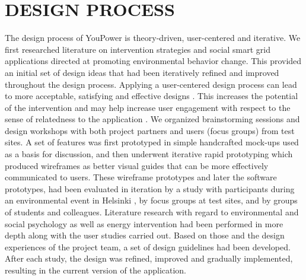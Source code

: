 

\section{\uppercase{Design Process}}

\noindent The design process of YouPower is theory-driven, user-centered and iterative. We first researched literature on intervention strategies and social smart grid applications directed at promoting environmental behavior change. This provided an initial set of design ideas that had been iteratively refined and improved throughout the design process. 
% 
Applying a user-centered design process can lead to more acceptable, satisfying and effective designs \cite{Brynjarsdottir2012}. This increases the potential of the intervention and may help increase user engagement with respect to the sense of relatedness to the application \cite{dick2012empowering,Pierce2012,schwartz2015people, edward2015review}. 
% 
We organized brainstorming sessions and design workshops with both project partners and users (focus groups) from test sites. A set of features was first prototyped in simple handcrafted mock-ups used as a basis for discussion, and then underwent iterative rapid prototyping which produced wireframes as better visual guides that can be more effectively communicated to users. These wireframe prototypes and later the software prototypes, had been evaluated in iteration by a study with participants during an environmental event in Helsinki \cite{Barssi2015}, by focus groups at test sites, and by groups of students and colleagues. 
% 
Literature research with regard to environmental and social psychology as well as energy intervention had been performed in more depth along with the user studies carried out. Based on those and  the design experiences of the project team, a set of design guidelines had been developed. 
After each study, the design was refined, improved and gradually implemented, resulting in the current version of the application. 


